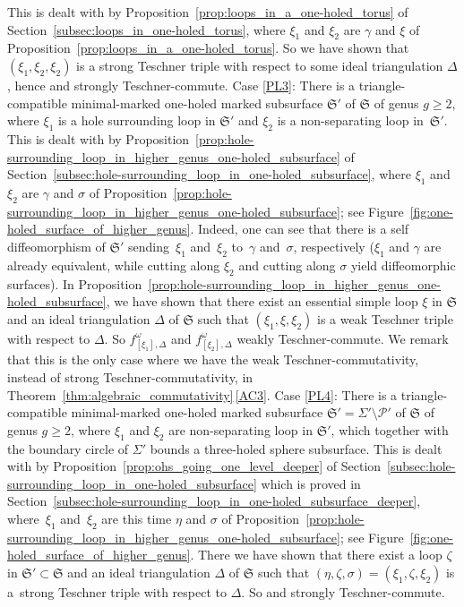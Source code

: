 \documentclass[10pt,a4paper]{amsart}
\numberwithin{equation}{section}
\theoremstyle{definition}
\begin{document}
This is dealt with by Proposition~\ref{prop:loops_in_a_one-holed_torus} of Section~\ref{subsec:loops_in_one-holed_torus}, where $\xi_1$ and $\xi_2$ are $\gamma$ and $\xi$ of Proposition~\ref{prop:loops_in_a_one-holed_torus}. So we have shown that $(\xi_1,\xi_2,\xi_2)$ is a strong Teschner triple with respect to some ideal triangulation $\Delta$, hence  and  strongly Teschner-commute.
Case {\ref{PL3}}: There is a triangle-compatible minimal-marked one-holed marked subsurface $\mathfrak{S}'$ of $\mathfrak{S}$ of genus $g\ge 2$, where $\xi_1$ is a hole surrounding loop in $\mathfrak{S}'$ and $\xi_2$ is a non-separating loop in~$\mathfrak{S}'$.
This is dealt with by Proposition~\ref{prop:hole-surrounding_loop_in_higher_genus_one-holed_subsurface} of Section~\ref{subsec:hole-surrounding_loop_in_one-holed_subsurface}, where $\xi_1$ and $\xi_2$ are $\gamma$ and $\sigma$ of Proposition~\ref{prop:hole-surrounding_loop_in_higher_genus_one-holed_subsurface}; see Figure~\ref{fig:one-holed_surface_of_higher_genus}. Indeed, one can see that there is a self diffeomorphism of $\mathfrak{S}'$ sending~$\xi_1$ and~$\xi_2$ to~$\gamma$ and~$\sigma$, respectively ($\xi_1$ and $\gamma$ are already equivalent, while cutting along $\xi_2$ and cutting along $\sigma$ yield diffeomorphic surfaces). In Proposition~\ref{prop:hole-surrounding_loop_in_higher_genus_one-holed_subsurface}, we have shown that there exist an essential simple loop $\xi$ in $\mathfrak{S}$ and an ideal triangulation $\Delta$ of $\mathfrak{S}$ such that $(\xi_1,\xi,\xi_2)$ is a weak Teschner triple with respect to $\Delta$. So $f^\omega_{[\xi_1],\Delta}$ and $f^\omega_{[\xi_2],\Delta}$ weakly Teschner-commute. We remark that this is the only case where we have the weak Teschner-commutativity, instead of strong Teschner-commutativity, in Theorem~\ref{thm:algebraic_commutativity}\,\ref{AC3}.
{\samepage Case {\ref{PL4}}: There is a triangle-compatible minimal-marked one-holed marked subsurface $\mathfrak{S}'=\Sigma'\setminus\mathcal{P}'$ of $\mathfrak{S}$ of genus $g\ge 2$, where $\xi_1$ and $\xi_2$ are non-separating loop in $\mathfrak{S}'$, which together with the boundary circle of $\Sigma'$ bounds a three-holed sphere subsurface.
}
This is dealt with by Proposition~\ref{prop:ohs_going_one_level_deeper} of Section~\ref{subsec:hole-surrounding_loop_in_one-holed_subsurface} which is proved in Section~\ref{subsec:hole-surrounding_loop_in_one-holed_subsurface_deeper}, where~$\xi_1$ and~$\xi_2$ are this time $\eta$ and $\sigma$ of Proposition~\ref{prop:hole-surrounding_loop_in_higher_genus_one-holed_subsurface}; see Figure~\ref{fig:one-holed_surface_of_higher_genus}. There we have shown that there exist a loop $\zeta$ in $\mathfrak{S}' \subset \mathfrak{S}$ and an ideal triangulation $\Delta$ of $\mathfrak{S}$ such that $(\eta,\zeta,\sigma) = (\xi_1,\zeta,\xi_2)$ is a~strong Teschner triple with respect to $\Delta$. So  and  strongly Teschner-commute.
\end{document}
